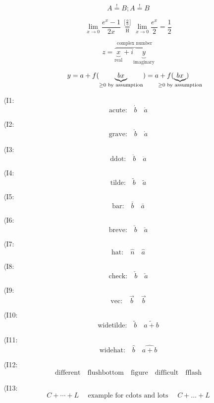 \documentclass{book}
\begin{document}
\begin{equation}
 A \overset{!}{=} B; A \stackrel{!}{=} B
\end{equation}

\begin{equation}
 \lim_{x\to 0}{\frac{e^x-1}{2x}}
 \overset{\left[\frac{0}{0}\right]}{\underset{\mathrm{H}}{=}}
 \lim_{x\to 0}{\frac{e^x}{2}}={\frac{1}{2}}
\end{equation}

\begin{equation}
 z = \overbrace{
   \underbrace{x}_\text{real} + i
   \underbrace{y}_\text{imaginary}
  }^\text{complex number}
\end{equation}

\begin{equation}
 y = a + f(\underbrace{b x}_{
                    \ge 0 \text{ by assumption}}) 
   = a + f(\underbrace{b x}_{
          \mathclap{\ge 0 \text{ by assumption}}})
\end{equation}


$\langle$I1:
$$\mbox{acute:}\quad \acute{b}\quad \acute{a}$$

$\langle$I2:
$$\mbox{grave:}\quad \grave{b}\quad \grave{a}$$

$\langle$I3:
$$\mbox{ddot:}\quad \ddot{b}\quad \ddot{a}$$

$\langle$I4:
$$\mbox{tilde:}\quad \tilde{b}\quad \tilde{a}$$

$\langle$I5:
$$\mbox{bar:}\quad\bar{b}\quad \bar{a}$$

$\langle$I6:
$$\mbox{breve:}\quad\breve{b}\quad \breve{a}$$

$\langle$I7:
$$\mbox{hat:}\quad\hat{n}\quad \hat{a}$$

$\langle$I8:
$$\mbox{check:}\quad\check{b}\quad \check{a}$$

$\langle$I9:
$$\mbox{vec:}\quad\vec{b}\quad \vec{b}$$

$\langle$I10:
$$\mbox{widetilde:}\quad\widetilde{b}\quad \widetilde{a+b}$$

$\langle$I11:
$$\mbox{widehat:}\quad\widehat{b}\quad \widehat{a+b}$$

$\langle$I12:
$$\mbox{different}\quad \mbox{flushbottom}\quad \mbox{figure}\quad\mbox{difficult}\quad \mbox{fflash}$$

$\langle$I13:
$$C + \cdots + L \quad \mbox{ example for cdots and lots } \quad C +
\ldots + L$$ 
\end{document}
